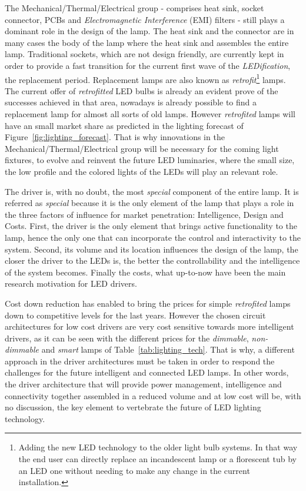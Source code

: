 The Mechanical/Thermal/Electrical group - comprises heat sink, socket connector, PCBs and \emph{Electromagnetic Interference} (EMI) filters - still plays a dominant role in the design of the lamp. The heat sink and the connector are in many cases the body of the lamp where the heat sink and assembles the entire lamp. Traditional sockets, which are not design friendly, are currently kept in order to provide a fast transition for the current first wave of the \emph{LEDification}, the replacement period. Replacement lamps are also known as \emph{retrofit}\footnote{Adding the new LED technology to the older light bulb systems. In that way the end user can directly replace an incandescent lamp or a florescent tub by an LED one without needing to make any change in the current installation.} lamps. The current offer of \emph{retrofitted} LED bulbs is already an evident prove of the successes achieved in that area, nowadays is already possible to find a replacement lamp for almost all sorts of old lamps. However \emph{retrofited} lamps will have an small market share as predicted in the lighting forecast of Figure~\ref{fig:lighting_forecast}. That is why innovations in the Mechanical/Thermal/Electrical group will be necessary for the coming light fixtures, to evolve and reinvent the future LED luminaries, where the small size, the low profile and the colored lights of the LEDs will play an relevant role.


The driver is, with no doubt, the most \emph{special} component of the entire lamp. It is referred as \emph{special} because it is the only element of the lamp that plays a role in the three factors of influence for market penetration: Intelligence, Design and Costs. First, the driver is the only element that brings active functionality to the lamp, hence the only one that can incorporate the control and interactivity to the system. Second, its volume and its location influences the design of the lamp, the closer the driver to the LEDs is, the better the controllability and the intelligence of the system becomes. Finally the costs, what up-to-now have been the main research motivation for LED drivers.

Cost down reduction has enabled to bring the prices for simple \emph{retrofited} lamps down to competitive levels for the last years. However the chosen circuit architectures for low cost drivers are very cost sensitive towards more intelligent drivers, as it can be seen with the different prices for the \emph{dimmable}, \emph{non-dimmable} and \emph{smart} lamps of  Table~\ref{tab:lighting_tech}. That is why, a different approach in the driver architectures must be taken in order to respond the challenges for the future intelligent and connected LED lamps. In other words, the driver architecture that will provide power management, intelligence and connectivity together assembled in a reduced volume and at low cost will be, with no discussion, the key element to vertebrate the future of LED lighting technology.

